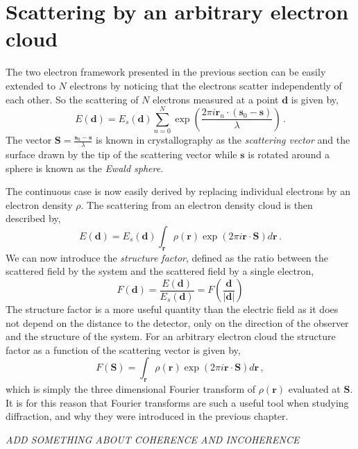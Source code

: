 \section{Scattering by an arbitrary electron cloud}\label{diffraction_physics}

The two electron framework presented in the previous section can be easily
extended to $N$ electrons by noticing that the electrons scatter independently
of each other. So the scattering of $N$ electrons measured at a point $\mathbf d$
is given by,
\begin{equation}
E(\mathbf d) = E_s(\mathbf d) \sum_{n=0}^N \exp\left(\frac{2 \pi i \mathbf r_n \cdot(\mathbf s_0 -
\mathbf s)}{\lambda}\right) \, .
\end{equation}
The vector $\mathbf S = \frac{\mathbf s_0 - \mathbf s}{\lambda}$ is known in crystallography
as the {\em scattering vector} and the surface drawn by the tip of the
scattering vector while $\mathbf s$ is rotated around a sphere is known as the
{\em Ewald sphere}.

The continuous case is now easily derived by replacing individual electrons by
an electron density $\rho$. The scattering from an electron density cloud is
then described by,
\begin{equation}
E(\mathbf d) = E_s(\mathbf d) \int_{\mathbf r} \rho(\mathbf r) \exp\left(2
    \pi i \mathbf r \cdot \mathbf S \right) d\mathbf r\, .
\end{equation}
We can now introduce the {\em structure factor}, defined as the ratio between
the scattered field by the system and the scattered field by a single
electron,
\begin{equation}
F(\mathbf d) = \frac{E(\mathbf d)}{E_s(\mathbf d)} = F\left(\frac{\mathbf d}{|\mathbf d|}\right)
\end{equation}
The structure factor is a more useful quantity than the electric field as it does not depend
on the distance to the detector, only on the direction of the observer and the
structure of the system. For an arbitrary electron cloud the structure factor as
a function of the scattering vector is given by,
\begin{equation}
F(\mathbf S) = \int_{\mathbf r} \rho(\mathbf r) \exp\left(2
    \pi i \mathbf r \cdot \mathbf S \right) d\mathbf r\, ,
\end{equation}
which is simply the three dimensional Fourier transform of $\rho(\mathbf r)$
evaluated at $\mathbf S$. It is for this reason that Fourier transforms are such
a useful tool when studying diffraction, and why they were introduced in the
previous chapter.


{\em ADD SOMETHING ABOUT COHERENCE AND INCOHERENCE}
